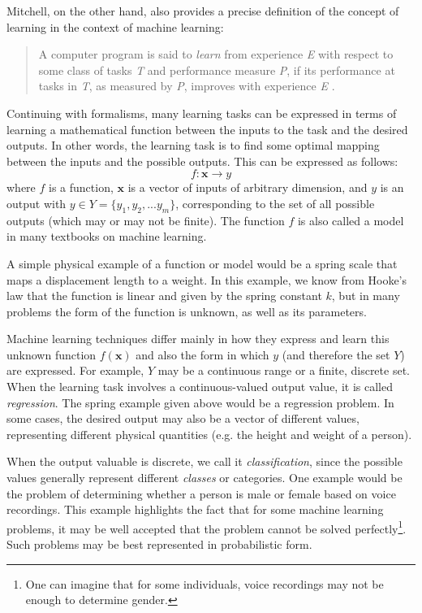 Mitchell, on the other hand,  also provides a precise definition of the concept of learning in the context of machine learning:
%
\begin{quote}
A computer program is said to \emph{learn} from experience \emph{E} with respect to some class of tasks \emph{T} and performance measure \emph{P}, if its performance at tasks in \emph{T}, as measured by \emph{P}, improves with experience \emph{E} \cite{Mitchell1997}.
\end{quote}
%
%
%


Continuing with formalisms, many learning tasks can be expressed in terms of learning a mathematical function between the inputs to the task and the desired outputs. In other words, the learning task is to find some optimal mapping between the inputs and the possible outputs. This can be expressed as follows:
%
\begin{equation}
f : \mathbf{x} \rightarrow y
\end{equation}where $f$ is a function, $\mathbf{x}$ is a vector of inputs of arbitrary dimension, and $y$ is an output with $y \in Y=\{y_1, y_2,...y_m\}$, corresponding to the set of all possible outputs (which may or may not be finite). The function $f$ is also called a model in many textbooks on machine learning.

A simple physical example of a function or model would be a spring scale that maps a displacement length to a weight. In this example, we know from Hooke's law that the function is linear and given by the spring constant $k$, but in many problems the form of the function is unknown, as well as its parameters.

Machine learning techniques differ mainly in how they express and learn this unknown function $f(\mathbf{x})$ and also the form in which $y$ (and therefore the set $Y$) are expressed. For example, $Y$ may be a continuous range or a finite, discrete set. When the learning task involves a continuous-valued output value, it is called \emph{regression}. The spring example given above would be a regression problem. In some cases, the desired output may also be a vector of different values, representing different physical quantities (e.g. the height and weight of a person).

When the output valuable is discrete, we call it \emph{classification}, since the possible values generally represent different \emph{classes} or categories. One example would be the problem of determining whether a person is male or female based on voice recordings. This example highlights the fact that for some machine learning problems, it may be well accepted that the problem cannot be solved perfectly\footnote{One can imagine that for some individuals, voice recordings may not be enough to determine gender.}. Such problems may be best represented in probabilistic form.

